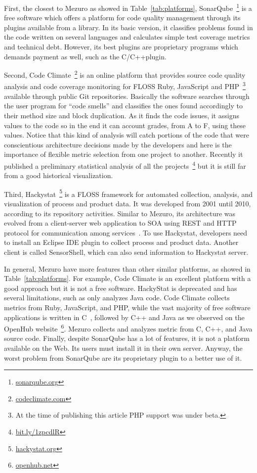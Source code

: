 First, the closest to Mezuro as showed in Table~\ref{tab:platforms},
SonarQube~\footnote{\url{sonarqube.org}} is a free software which offers a
platform for code quality management through its plugins available from a
library. In its basic version, it classifies problems found in the code written
on several languages and calculates simple test coverage metrics and technical
debt. However, its best plugins are proprietary programs which demands payment
as well, such as the C/C++plugin.

Second, Code Climate~\footnote{\url{codeclimate.com}} is an online
platform that provides source code quality analysis and code coverage
monitoring for FLOSS Ruby, JavaScript and PHP~\footnote{At the
time of publishing this article PHP support was under beta.} available through
public Git repositories. Basically the software searches through the user
program for ``code smells'' and classifies the ones found accordingly to their
method size and block duplication. As it finds the code issues, it assigns
values to the code so in the end it can account grades, from A to F, using
these values. Notice that this kind of analysis will catch portions of the code
that were conscientious architecture decisions made by the developers and here
is the importance of flexible metric selection from one project to another.
Recently it published a preliminary statistical analysis of all the
projects~\footnote{\url{bit.ly/1zpcdlR}}
but it is still far from a good historical visualization.

Third, Hackystat~\footnote{\url{hackystat.org}} is a FLOSS framework for
automated collection, analysis, and visualization of process and product data.
It was developed from 2001 until 2010, according to its repository activities.
Similar to Mezuro, its architecture was evolved from a client-server web
application to SOA using REST and HTTP protocol for communication among
services~\cite{chauhan2011}.  To use Hackystat, developers need to install an
Eclipse IDE plugin to collect process and product data. Another client is
called SensorShell, which can also send information to Hackystat server.

In general, Mezuro have more features than other similar platforms, as showed
in Table~\ref{tab:platforms}. For example, Code Climate is an excellent
platform with a good approach but it is not a free software. HackyStat is
deprecated and has several limitations, such as only analyzes Java code. Code
Climate collects metrics from Ruby, JavaScript, and PHP, while the vast
majority of free software applications is written in C~\cite{robles2006},
followed by C++ and Java as we observed on the OpenHub
website~\footnote{\url{openhub.net}}. Mezuro collects and analyzes metric from
C, C++, and Java source code. Finally, despite SonarQube has a lot of features,
it is not a platform available on the Web. Its users must install it in their
own server. Anyway, the worst problem from SonarQube are its proprietary plugin
to a better use of it.

